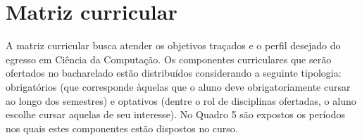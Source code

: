 \section{Matriz curricular}

A matriz curricular busca atender os objetivos traçados e o perfil desejado do egresso em Ciência da Computação. Os componentes curriculares que serão ofertados no bacharelado estão distribuídos considerando a seguinte tipologia: obrigatórios (que corresponde àquelas que o aluno deve obrigatoriamente cursar ao longo dos semestres) e optativos (dentre o rol de disciplinas ofertadas, o aluno escolhe cursar aquelas de seu interesse). No Quadro 5 são expostos os períodos nos quais estes componentes estão dispostos no curso.

\begin{center}
  

\end{center}
